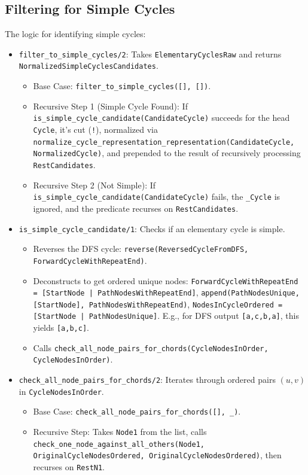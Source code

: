 \documentclass[12pt,a4paper]{article}
\begin{document}
\subsection{Filtering for Simple Cycles}
The logic for identifying simple cycles:
\begin{itemize}
\item \texttt{filter\_to\_simple\_cycles/2}: Takes \texttt{ElementaryCyclesRaw} and returns \texttt{NormalizedSimpleCyclesCandidates}.
\begin{itemize}
\item Base Case: \texttt{filter\_to\_simple\_cycles([], [])}.
\item Recursive Step 1 (Simple Cycle Found): If \texttt{is\_simple\_cycle\_candidate(CandidateCycle)} succeeds for the head \texttt{Cycle}, it's cut (\texttt{!}), normalized via \texttt{normalize\_cycle\_representation\_representation(CandidateCycle, NormalizedCycle)}, and prepended to the result of recursively processing \texttt{RestCandidates}.
\item Recursive Step 2 (Not Simple): If \texttt{is\_simple\_cycle\_candidate(CandidateCycle)} fails, the \texttt{\_Cycle} is ignored, and the predicate recurses on \texttt{RestCandidates}.
\end{itemize}
\item \texttt{is\_simple\_cycle\_candidate/1}: Checks if an elementary cycle is simple.
\begin{itemize}
\item Reverses the DFS cycle: \texttt{reverse(ReversedCycleFromDFS, ForwardCycleWithRepeatEnd)}.
\item Deconstructs to get ordered unique nodes: \texttt{ForwardCycleWithRepeatEnd = [StartNode | PathNodesWithRepeatEnd]}, \texttt{append(PathNodesUnique, [StartNode], PathNodesWithRepeatEnd)}, \texttt{NodesInCycleOrdered = [StartNode | PathNodesUnique]}. E.g., for DFS output \texttt{[a,c,b,a]}, this yields \texttt{[a,b,c]}.
\item Calls \texttt{check\_all\_node\_pairs\_for\_chords(CycleNodesInOrder, CycleNodesInOrder)}.
\end{itemize}
\item \texttt{check\_all\_node\_pairs\_for\_chords/2}: Iterates through ordered pairs $(u,v)$ 
 in \texttt{CycleNodesInOrder}.
\begin{itemize}
\item Base Case: \texttt{check\_all\_node\_pairs\_for\_chords([], \_)}.
\item Recursive Step: Takes \texttt{Node1} from the list, calls \newline \texttt{check\_one\_node\_against\_all\_others(Node1, OriginalCycleNodesOrdered, OriginalCycleNodesOrdered)}, then recurses on \texttt{RestN1}.

\end{itemize}
\end{itemize}
\end{document}
